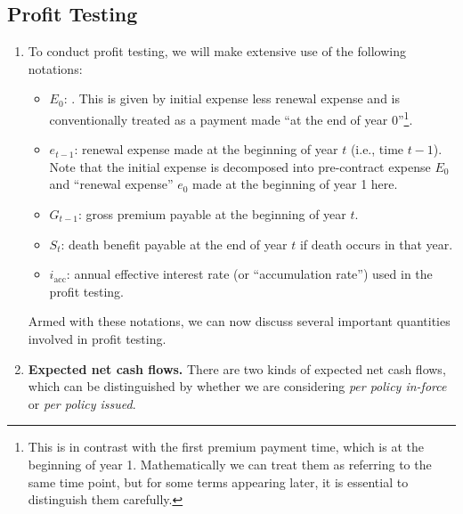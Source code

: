\subsection{Profit Testing}
\begin{enumerate}
\item To conduct profit testing, we will make extensive use of the following
notations:
\begin{itemize}
\item \(E_0\): . This is given by initial expense
less renewal expense and is conventionally treated as a payment made ``at the
end of year 0''\footnote{This is in contrast with the first premium payment
time, which is at the beginning of year 1. Mathematically we can treat them as
referring to the same time point, but for some terms appearing later, it is
essential to distinguish them carefully.}.

\item \(e_{t-1}\): renewal expense made at the beginning of year \(t\) (i.e.,
time \(t-1\)). Note that the initial expense is decomposed into pre-contract
expense \(E_0\) and ``renewal expense'' \(e_0\) made at the beginning of year 1
here.

\item \(G_{t-1}\): gross premium payable at the beginning of year \(t\).

\item \(S_t\): death benefit payable at the end of year \(t\) if death occurs
in that year.
\item \(i_{\mathrm{acc}}\): annual effective interest rate (or ``accumulation
rate'') used in the profit testing.
\end{itemize}
Armed with these notations, we can now discuss several important quantities
involved in profit testing.
\item \label{it:exp-ncf-fmlas} \textbf{Expected net cash flows.} There are two
kinds of expected net cash flows, which can be distinguished by whether we are
considering \emph{per policy in-force} or \emph{per policy issued}.


\end{enumerate}
